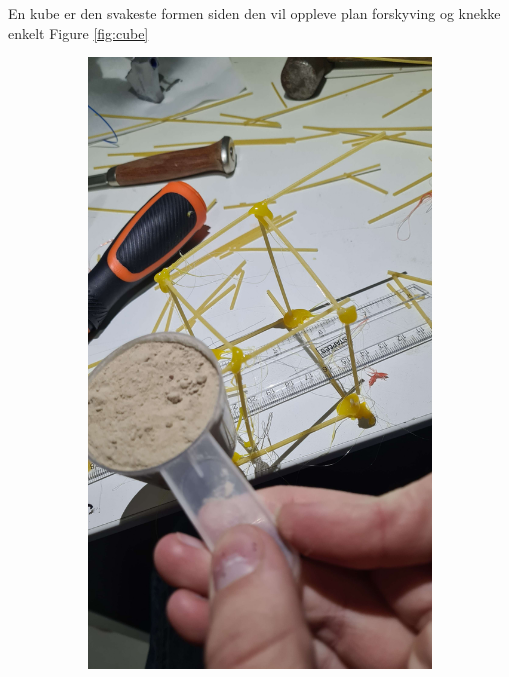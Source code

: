 \documentclass{report}
\newcommand{\subimgw}{.7\linewidth}
\begin{document}
En kube er den svakeste formen siden den vil oppleve plan forskyving og knekke enkelt Figure \ref{fig:cube}

\begin{figure}[H]
	\begin{subfigure}{.5\textwidth}
		\centering
		\includegraphics[width=\subimgw]{cube-a}


\end{subfigure}
\end{figure}
\end{document}
